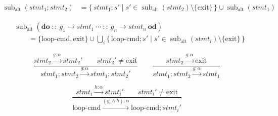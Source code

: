\documentclass[border=6pt]{standalone}
\begin{document}
\begin{minipage}{15.2cm}
\small
\begin{align*}
  \operatorname{sub}_{\mathrm{alt}}(stmt_1;stmt_2)
  &=
  \{\, stmt_1;s' \mid s' \in
  \operatorname{sub}_{\mathrm{alt}}(stmt_2)\setminus\{\mathrm{exit}\}\,\}
  \cup
  \operatorname{sub}_{\mathrm{alt}}(stmt_1)
\end{align*}

\begin{align*}
  &\operatorname{sub}_{\mathrm{alt}}
  (\mathbf{do}\ ::\ g_1 \to stmt_1\ \cdots\ ::\ g_n \to stmt_n\ \mathbf{od})
  \\[-1mm]
  &\qquad =
  \{\mathrm{loop\mbox{-}cmd},\mathrm{exit}\}
  \cup
  \bigcup_i
  \{\,\mathrm{loop\mbox{-}cmd};s'
  \mid
  s' \in \operatorname{sub}_{\mathrm{alt}}(stmt_i)\setminus\{\mathrm{exit}\}\,\}
\end{align*}

\[
  \frac{
    stmt_2 \xrightarrow{g:\alpha} stmt_2'
    \qquad
    stmt_2' \neq \mathrm{exit}
  }{
    stmt_1;stmt_2 \xrightarrow{g:\alpha} stmt_1;stmt_2'
  }
  \qquad
  \frac{
    stmt_2 \xrightarrow{g:\alpha} \mathrm{exit}
  }{
    stmt_1;stmt_2 \xrightarrow{g:\alpha} stmt_1
  }
\]

\[
  \frac{
    stmt_i \xrightarrow{h:\alpha} stmt_i'
    \qquad
    stmt_i' \neq \mathrm{exit}
  }{
    \mathrm{loop\mbox{-}cmd}
    \xrightarrow{(g_i \land h):\alpha}
    \mathrm{loop\mbox{-}cmd};stmt_i'
  }
\]
\end{minipage}
\end{document}
